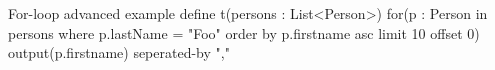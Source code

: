 \begin{webdsl}{For-loop advanced example}
define t(persons : List<Person>) {
	for(p : Person in persons where p.lastName = "Foo" order by p.firstname asc limit 10 offset 0) {
		output(p.firstname)
  } seperated-by { "," }
}
\end{webdsl}





% 
% 
% 
% 
% 
% 
% 


